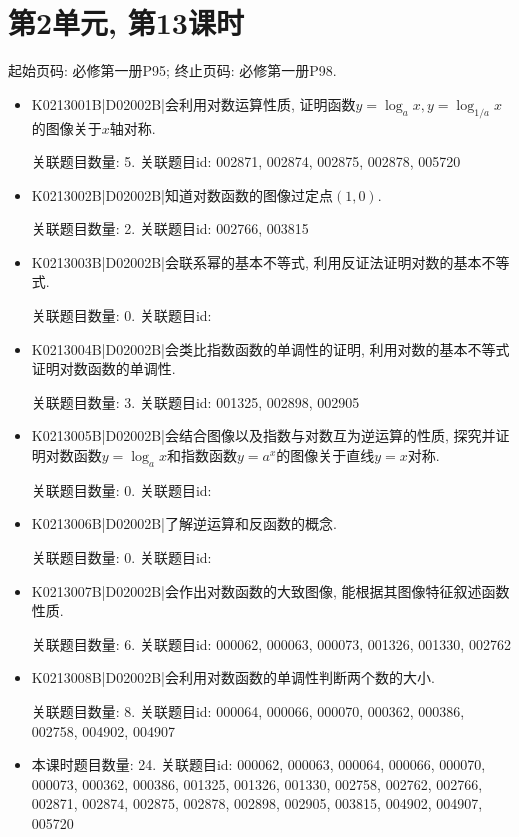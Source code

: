\section*{第2单元, 第13课时}
起始页码: 必修第一册P95; 终止页码: 必修第一册P98.
\begin{itemize}
\item K0213001B|D02002B|会利用对数运算性质, 证明函数$y=\log_ax,y=\log_{1/a}x$的图像关于$x$轴对称.

关联题目数量: 5. 关联题目id: 002871, 002874, 002875, 002878, 005720

\item K0213002B|D02002B|知道对数函数的图像过定点$(1,0)$.

关联题目数量: 2. 关联题目id: 002766, 003815

\item K0213003B|D02002B|会联系幂的基本不等式, 利用反证法证明对数的基本不等式.

关联题目数量: 0. 关联题目id: 

\item K0213004B|D02002B|会类比指数函数的单调性的证明, 利用对数的基本不等式证明对数函数的单调性.

关联题目数量: 3. 关联题目id: 001325, 002898, 002905

\item K0213005B|D02002B|会结合图像以及指数与对数互为逆运算的性质, 探究并证明对数函数$y=\log_ax$和指数函数$y=a^{x}$的图像关于直线$y=x$对称.

关联题目数量: 0. 关联题目id: 

\item K0213006B|D02002B|了解逆运算和反函数的概念.

关联题目数量: 0. 关联题目id: 

\item K0213007B|D02002B|会作出对数函数的大致图像, 能根据其图像特征叙述函数性质.

关联题目数量: 6. 关联题目id: 000062, 000063, 000073, 001326, 001330, 002762

\item K0213008B|D02002B|会利用对数函数的单调性判断两个数的大小.

关联题目数量: 8. 关联题目id: 000064, 000066, 000070, 000362, 000386, 002758, 004902, 004907

\item 本课时题目数量: 24. 关联题目id: 000062, 000063, 000064, 000066, 000070, 000073, 000362, 000386, 001325, 001326, 001330, 002758, 002762, 002766, 002871, 002874, 002875, 002878, 002898, 002905, 003815, 004902, 004907, 005720

\end{itemize}

